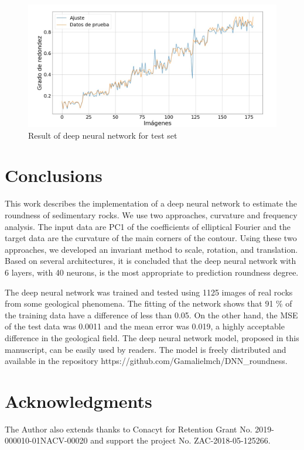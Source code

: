 \documentclass[conference]{IEEEtran}
\begin{document}
\begin{figure}[htbp]
\centerline{\includegraphics[scale=0.3]{fig8.png}}
\caption{Result of deep neural network for test set}
\label{fig8}
\end{figure}

\section{Conclusions}
This work describes the implementation of a deep neural network to estimate the roundness of sedimentary rocks. We use two approaches, curvature and frequency analysis. The input data are PC1 of the coefficients of elliptical Fourier and the target data are the curvature of the main corners of the contour. Using these two approaches, we developed an invariant method to scale, rotation, and translation. Based on several architectures, it is concluded that the deep neural network with 6 layers, with 40 neurons, is the most appropriate to prediction roundness degree. 

The deep neural network was trained and tested using 1125 images of real rocks from some geological phenomena. The fitting of the network shows that 91 \% of the training data have a difference of less than 0.05. On the other hand, the MSE of the test data was 0.0011 and the mean error was 0.019, a highly acceptable difference in the geological field. The deep neural network model, proposed in this manuscript, can be easily used by readers. The model is freely distributed and available in the repository https://github.com/Gamalielmch/DNN\_roundness.


\section*{Acknowledgments}

The Author also extends thanks to Conacyt for Retention Grant No. 2019-000010-01NACV-00020 and support the project No. ZAC-2018-05-125266. 
\end{document}
